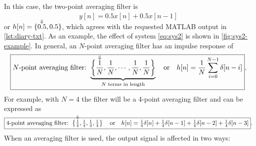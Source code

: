 \documentclass{ajhlabreport}
\newcommand{\marker}[1]{\ensuremath{\smash{\overset{\Downarrow}{#1}}}}
\begin{document}
In this case, the two-point averaging filter is
\begin{align}
y[n] = 0.5x[n] + 0.5x[n-1]
\label{eq:sys2}
\end{align} or $h[n] = \{\marker{0.5},0.5\}$, which agrees with the requested
MATLAB output in \autoref{lst:diary-txt}. As an example, the effect of system
\eqref{eq:sys2} is shown in \autoref{fig:sys2-example}. In general, an
$N$-point averaging filter has an impulse response of \[
%
\boxed{
\text{$N$-point averaging filter: }
\underbrace{\left\{\marker{\frac{1}{N}}, \frac{1}{N}, \cdots, \frac{1}{N},
\frac{1}{N}\right\}}_\text{$N$ terms in length}
\quad\text{or}\quad
h[n] = \frac{1}{N} \sum_{i=0}^{N-1} \delta[n-i]
}
%
\text{.} \] For example, with $N = 4$ the filter will be a 4-point averaging
filter and can be expressed as \[
%
\boxed{
\text{$4$-point averaging filter: }
\left\{\marker{\tfrac{1}{4}}, \tfrac{1}{4}, \tfrac{1}{4},
\tfrac{1}{4}\right\}
\quad\text{or}\quad
h[n]=\tfrac{1}{4}\delta[n] +
\tfrac{1}{4}\delta[n-1] + \tfrac{1}{4}\delta[n-2] + \tfrac{1}{4}\delta[n-3]
}
%
\text{.} \]
%
When an averaging filter is used, the output signal is affected in two ways:
\end{document}
